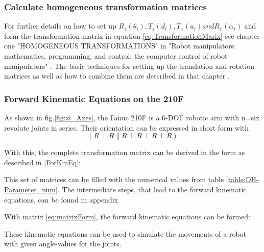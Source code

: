 \subsubsection{Calculate homogeneous transformation matrices}

For further details on how to set up $R_z(\theta_i), T_z(d_i), T_x(a_i) and R_x(\alpha_i)$ and form the transformation matrix in equation \ref{eq:TransformationMarix} see chapter one "HOMOGENEOUS TRANSFORMATIONS" in "Robot manipulators: mathematics, programming, 
and control: the computer control of robot manipulators" \cite{Paul1981RobotM}. The basic techniques for setting up the translation and rotation matrices as well as how to combine them are described in that chapter .




\subsubsection{Forward Kinematic Equations on the 210F}
As shown in fig.\ref{fig:zi_Axes}, the Fanuc 210F is a 6-\ac{DOF} robotic arm with n=six revolute joints in series. 
Their orientation can be expressed in short form with 
\begin{equation}
(R\perp R\parallel R\perp R\perp R\perp R )
\end{equation}

With this, the complete transformation matrix can be derived in the form as described in \ref{ForKinEq}:



This set of matrices can be filled with the numerical values from table \ref{table:DH-Parameter_num}. The intermediate steps, that lead to the forward kinematic equations, can be found in appendix 


With matrix \ref{eq:matrixForm}, the forward kinematic equations can be formed:




These kinematic equations can be used to simulate the movements of a robot with given angle-values for the joints. 



